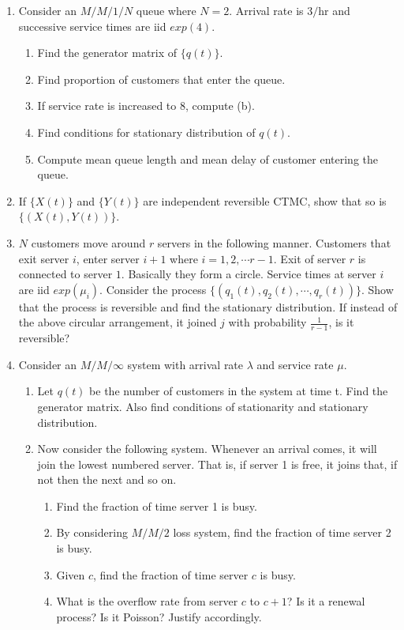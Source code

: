 \documentclass[a4paper,10pt]{article}
\begin{document}
\begin{enumerate}
	\item Consider an $M/M/1/N$ queue where $N=2$. Arrival rate is $3/$hr and successive service times are iid $exp(4)$.
	\begin{enumerate}
		\item Find the generator matrix of $\{q(t)\}$.
		\item Find proportion of customers that enter the queue.
		\item If service rate is increased to 8, compute (b).
		\item Find conditions for stationary distribution of $q(t)$.
		\item Compute mean queue length and mean delay of customer entering the queue.
		\end{enumerate}
		
   \item If $\{X(t)\}$ and $\{Y(t)\}$ are independent reversible CTMC, show that so is $\{(X(t),Y(t))\}$.
	
	\item $N$ customers move around $r$ servers in the following manner. Customers that exit server $i$, enter server $i+1$ where $i=1,2,\cdots r-1$. Exit of server $r$ is connected to server $1$. Basically they form a circle. Service times at server $i$ are iid $exp(\mu_i)$. Consider the process $\{(q_1(t), q_2(t),\cdots, q_r(t))\}$.
 Show that the process is reversible and find the stationary distribution. If instead of the above circular arrangement, it joined $j$ with probability $\frac{1}{r-1}$, is it reversible?
 
\item Consider an $M/M/\infty$ system with arrival rate $\lambda$ and service rate $\mu$. 
\begin{enumerate}
	\item Let $q(t)$ be the number of customers in the system at time t. Find the generator matrix. Also find conditions of stationarity and stationary distribution.  
	\item Now consider the following system. Whenever an arrival comes, it will join the lowest numbered server. That is, if server 1 is free, it joins that, if not then the next and so on. 
	\begin{enumerate}
		\item Find the fraction of time server 1 is busy.
		\item By considering $M/M/2$ loss system, find the fraction of time server 2 is busy.
		\item Given $c$, find the fraction of time server $c$ is busy.
		\item What is the overflow rate from server $c$ to $c+1$? Is it a renewal process? Is it Poisson? Justify accordingly.
	\end{enumerate}
\end{enumerate}


\end{enumerate}
\end{document}

